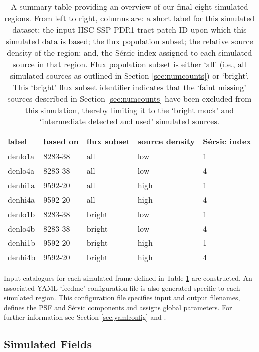 \documentclass[fleqn,usenatbib,useAMS]{mnras}
\newcommand*{\Sersic}{S\'{e}rsic\xspace}
\begin{document}
\begin{table}
    \setlength{\tabcolsep}{5pt}
    \begin{tabular}{ l | l | l | l | l }
    label & based on & flux subset & source density & \Sersic index\\
    \hline
    denlo1a & 8283-38 & all & low & 1\\
    denlo4a & 8283-38 & all & low & 4\\
    denhi1a & 9592-20 & all & high & 1\\
    denhi4a & 9592-20 & all & high & 4\\
    denlo1b & 8283-38 & bright & low & 1\\
    denlo4b & 8283-38 & bright & low & 4\\
    denhi1b & 9592-20 & bright & high & 1\\
    denhi4b & 9592-20 & bright & high & 4\\
    \end{tabular}
    \caption{A summary table providing an overview of our final eight simulated regions. From left to right, columns are: a short label for this simulated dataset; the input HSC-SSP PDR1 tract-patch ID upon which this simulated data is based; the flux population subset; the relative source density of the region; and, the \Sersic index assigned to each simulated source in that region. Flux population subset is either `all' (i.e., all simulated sources as outlined in Section \ref{sec:numcounts}) or `bright'. This `bright' flux subset identifier indicates that the `faint missing' sources described in Section \ref{sec:numcounts} have been excluded from this simulation, thereby limiting it to the `bright mock' and `intermediate detected and used' simulated sources. }
    \label{tab:simtab}
\end{table}

Input catalogues for each simulated frame defined in Table \ref{tab:simtab} are constructed. An associated YAML `feedme' configuration file is also generated specific to each simulated region. This configuration file specifies input and output filenames, defines the PSF and \Sersic components and assigns global parameters. For further information see Section \ref{sec:yamlconfig} and \citet{Rowe2015}. 

\subsection{Simulated Fields}
\label{sec:simfields}
\end{document}
